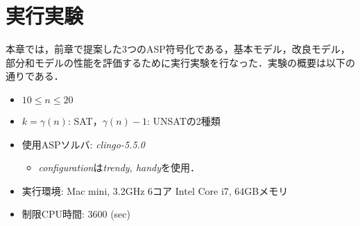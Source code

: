 \chapter{実行実験}\label{chap:experiment}
本章では，前章で提案した3つのASP符号化である，基本モデル，改良モデル，部分和モデルの性能を評価するために実行実験を行なった．実験の概要は以下の通りである．
\begin{itemize}
 \item  $10 \leq n \leq 20$
 \item $ k = \gamma(n)$: SAT，$\gamma(n)-1$: UNSATの2種類
 \item 使用ASPソルバ: \textit{clingo-5.5.0}
       \begin{itemize}
	\item \textit{configuration}は\textit{trendy, handy}を使用．
       \end{itemize}
 \item 実行環境: Mac mini, 3.2GHz 6コア Intel Core i7, 64GBメモリ
 \item 制限CPU時間: 3600 (sec)
\end{itemize}

